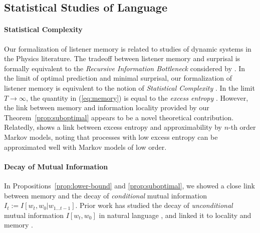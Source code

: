 \subsection{Statistical Studies of Language}

\paragraph{Statistical Complexity}
Our formalization of listener memory is related to studies of dynamic systems in the Physics literature.
The tradeoff between listener memory and surprisal is formally equivalent to the \emph{Recursive Information Bottleneck} considered by \cite{still-information-2014}.
In the limit of optimal prediction and minimal surprisal, our formalization of listener memory is equivalent to the notion of \emph{Statistical Complexity} \citep{crutchfield-inferring-1989}.
In the limit $T \rightarrow \infty$, the quantity in (\ref{eq:memory}) is equal to the \emph{excess entropy} \citep{crutchfield-inferring-1989}.
However, the link between memory and information locality provided by our Theorem~\ref{prop:suboptimal} appears to be a novel theoretical contribution.
Relatedly, \cite{sharan-prediction-2016} shows a link between excess entropy and approximability by $n$-th order Markov models, noting that processes with low excess entropy can be approximated well with Markov models of low order.


\paragraph{Decay of Mutual Information}
In Propositions~\ref{prop:lower-bound} and \ref{prop:suboptimal}, we showed a close link between memory and the decay of \emph{conditional} mutual information $I_t := I[w_t, w_0 | w_{1\dots t-1}]$.
Prior work has studied the decay of \emph{unconditional} mutual information $I[w_t, w_0]$ in natural language \citep{ebeling-entropy-1994,lin-critical-2017}, and linked it to locality and memory \citep{futrell-noisy-context-2017}.

